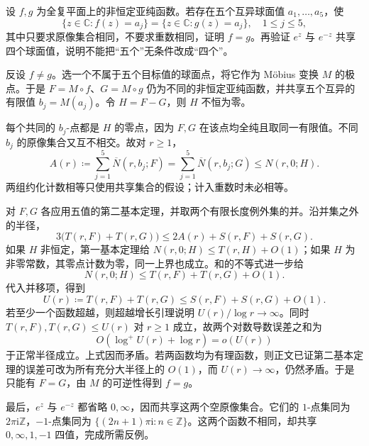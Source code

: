 \begin{optionalexercise}[五值唯一性]\label{b3:ex:C-8}
设 \(f,g\) 为全复平面上的非恒定亚纯函数。若存在五个互异球面值 \(a_1,\ldots,a_5\)，使
\[
 \{z\in\mathbb C:f(z)=a_j\}
 =\{z\in\mathbb C:g(z)=a_j\},\quad 1\le j\le5,
\]
其中只要求原像集合相同，不要求重数相同，证明 \(f=g\)。再验证 \(e^z\) 与 \(e^{-z}\) 共享四个球面值，说明不能把“五个”无条件改成“四个”。
\end{optionalexercise}
\begin{solution}
反设 \(f\ne g\)。选一个不属于五个目标值的球面点，将它作为 Möbius 变换 \(M\) 的极点。于是 \(F=M\circ f\)、\(G=M\circ g\) 仍为不同的非恒定亚纯函数，并共享五个互异的有限值 \(b_j=M(a_j)\)。令 \(H=F-G\)，则 \(H\) 不恒为零。

每个共同的 \(b_j\)-点都是 \(H\) 的零点，因为 \(F,G\) 在该点均全纯且取同一有限值。不同 \(b_j\) 的原像集合又互不相交。故对 \(r\ge1\)，
\[
 A(r)\coloneqq\sum_{j=1}^5\overline N(r,b_j;F)
 =\sum_{j=1}^5\overline N(r,b_j;G)
 \le N(r,0;H).
\]
两组约化计数相等只使用共享集合的假设；计入重数时未必相等。

对 \(F,G\) 各应用五值的第二基本定理，并取两个有限长度例外集的并。沿并集之外的半径，
\[
 3\bigl(T(r,F)+T(r,G)\bigr)
 \le2A(r)+S(r,F)+S(r,G).
\]
如果 \(H\) 非恒定，第一基本定理给 \(N(r,0;H)\le T(r,H)+O(1)\)；如果 \(H\) 为非零常数，其零点计数为零，同一上界也成立。和的不等式进一步给
\[
 N(r,0;H)\le T(r,F)+T(r,G)+O(1).
\]
代入并移项，得到
\[
 U(r)\coloneqq T(r,F)+T(r,G)
 \le S(r,F)+S(r,G)+O(1).
\]
若至少一个函数超越，则超越增长引理说明 \(U(r)/\log r\to\infty\)。同时 \(T(r,F),T(r,G)\le U(r)\) 对 \(r\ge1\) 成立，故两个对数导数误差之和为
\[
 O(\log^+U(r)+\log r)=o(U(r))
\]
于正常半径成立。上式因而矛盾。若两函数均为有理函数，则正文已证第二基本定理的误差可改为所有充分大半径上的 \(O(1)\)，而 \(U(r)\to\infty\)，仍然矛盾。于是只能有 \(F=G\)，由 \(M\) 的可逆性得到 \(f=g\)。

最后，\(e^z\) 与 \(e^{-z}\) 都省略 \(0,\infty\)，因而共享这两个空原像集合。它们的 \(1\)-点集同为 \(2\pi\mathrm{i}\mathbb Z\)，\(-1\)-点集同为 \(\{(2n+1)\pi\mathrm{i}:n\in\mathbb Z\}\)。这两个函数不相同，却共享 \(0,\infty,1,-1\) 四值，完成所需反例。
\end{solution}
